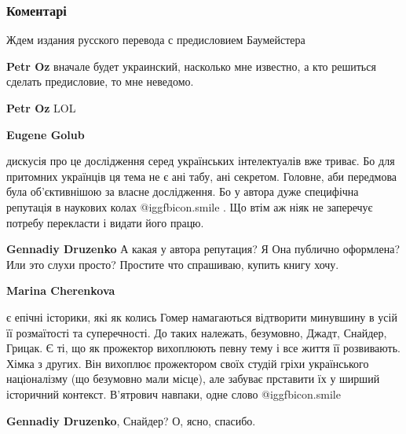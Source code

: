  
 
 
 
 
\subsubsection{Коментарі}

\begin{itemize} %
Ждем издания русского перевода с предисловием Баумейстера

\begin{itemize} %
\textbf{Petr Oz} вначале будет украинский, насколько мне известно, а кто решиться сделать предисловие, то мне неведомо.

\textbf{Petr Oz} LOL


\textbf{Eugene Golub} 

дискусія про це дослідження серед українських інтелектуалів вже триває. Бо для
притомних українців ця тема не є ані табу, ані секретом. Головне, аби передмова
була об’єктивнішою за власне дослідження. Бо у автора дуже специфічна репутація
в наукових колах  @igg{fbicon.smile} . Що втім аж ніяк не заперечує потребу перекласти і видати
його працю.

\textbf{Gennadiy Druzenko} А какая у автора репутация? Я Она публично оформлена? Или это слухи просто? Простите что спрашиваю, купить книгу хочу.


\textbf{Marina Cherenkova} 

є епічні історики, які як колись Гомер намагаються відтворити минувшину в усій
її розмаїтості та суперечності. До таких належать, безумовно, Джадт, Снайдер,
Грицак. Є ті, що як прожектор вихоплюють певну тему і все життя її розвивають.
Хімка з других. Він вихоплює прожектором своїх студій гріхи українського
націоналізму (що безумовно мали місце), але забуває прставити їх у ширший
історичний контекст. В’ятрович навпаки, одне слово  @igg{fbicon.smile} 

\textbf{Gennadiy Druzenko}, Снайдер? О, ясно, спасибо.


\end{itemize}
\end{itemize}
